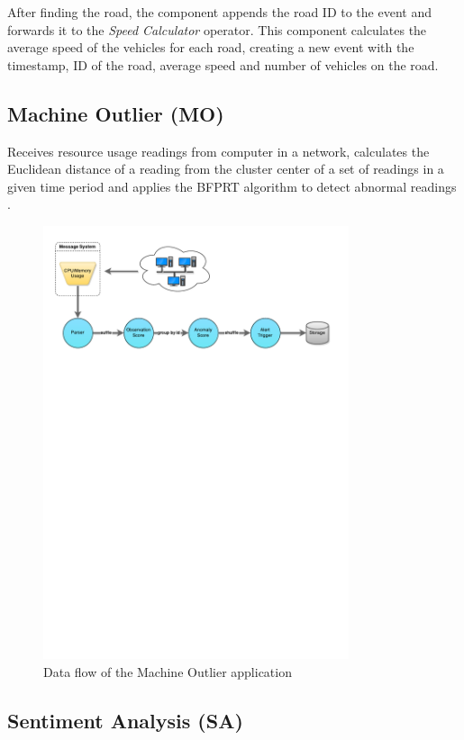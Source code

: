 \documentclass[ppgc,diss,english]{iiufrgs}
\begin{document}
After finding the road, the component appends the road ID to the event and forwards it to the \emph{Speed Calculator} operator. This component calculates the average speed of the vehicles for each road, creating a new event with the timestamp, ID of the road, average speed and number of vehicles on the road.


\subsection{Machine Outlier (MO)}

Receives resource usage readings from computer in a network, calculates the Euclidean distance of a reading from the cluster center of a set of readings in a given time period and applies the BFPRT algorithm to detect abnormal readings \cite{yoon2007approach}.

\begin{figure}[!ht]
	\centering
	\includegraphics[width=0.8\textwidth]{images/apps/MachineOutlier.pdf}
	\caption{Data flow of the Machine Outlier application}
	\label{fig:app_machine_outlier}
\end{figure}

\subsection{Sentiment Analysis (SA)}
\end{document}

